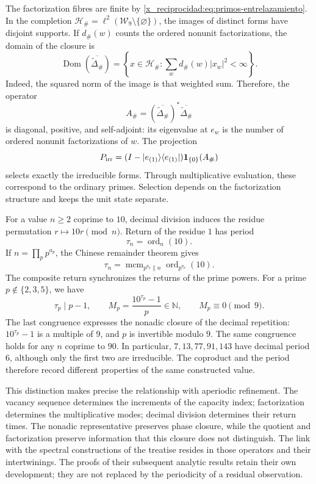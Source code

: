 The factorization fibres are finite by
\eqref{x_reciprocidad:eq:primos-entrelazamiento}. In the completion
\(\mathcal H_\#=\ell^2(\mathcal W_9\setminus\{\varnothing\})\),
the images of distinct forms have disjoint supports. If
\(d_\#(w)\) counts the ordered nonunit factorizations, the domain
of the closure is
\[
 \operatorname{Dom}(\overline{\widetilde\Delta_\#})
 =\left\{x\in\mathcal H_\#:
       \sum_w d_\#(w)|x_w|^2<\infty\right\}.
\]
Indeed, the squared norm of the image is that weighted sum. Therefore,
the operator
\[
 A_\#=(\overline{\widetilde\Delta_\#})^*
                  \overline{\widetilde\Delta_\#}
\]
is diagonal, positive, and self-adjoint: its eigenvalue at \(e_w\) is the
number of ordered nonunit factorizations of \(w\). The projection
\[
 P_{\rm irr}=(I-|e_{(1)}\rangle\langle e_{(1)}|)
                    \mathbf1_{\{0\}}(A_\#)
\]
selects exactly the irreducible forms. Through multiplicative
evaluation, these correspond to the ordinary primes. Selection
depends on the factorization structure and keeps the unit
state separate.

For a value \(n\geq2\) coprime to \(10\), decimal division induces the
residue permutation \(r\mapsto10r\pmod n\). Return of the residue
\(1\) has period
\[
 \tau_n=\operatorname{ord}_n(10).
\]
If \(n=\prod_p p^{a_p}\), the Chinese remainder theorem gives
\[
 \tau_n=\operatorname{mcm}_{p^{a_p}\parallel n}
                    \operatorname{ord}_{p^{a_p}}(10).
\]
The composite return synchronizes the returns of the prime powers.
For a prime \(p\notin\{2,3,5\}\), we have
\[
 \tau_p\mid p-1,\qquad
 M_p=\frac{10^{\tau_p}-1}{p}\in\mathbb N,
 \qquad M_p\equiv0\pmod9.
\]
The last congruence expresses the nonadic closure of the decimal repetition:
\(10^{\tau_p}-1\) is a multiple of \(9\), and \(p\) is invertible modulo
\(9\). The same congruence holds for any \(n\) coprime to
\(90\). In particular, \(7,13,77,91,143\) have decimal period \(6\),
although only the first two are irreducible. The coproduct and the period
therefore record different properties of the same constructed value.

This distinction makes precise the relationship with aperiodic refinement.
The vacancy sequence determines the increments of the capacity
index; factorization determines the multiplicative modes;
decimal division determines their return times. The nonadic
representative preserves phase closure, while the quotient and
factorization preserve information that this closure does not distinguish. The
link with the spectral constructions of the treatise resides in those
operators and their intertwinings. The proofs of their subsequent
analytic results retain their own development; they are not replaced by
the periodicity of a residual observation.

